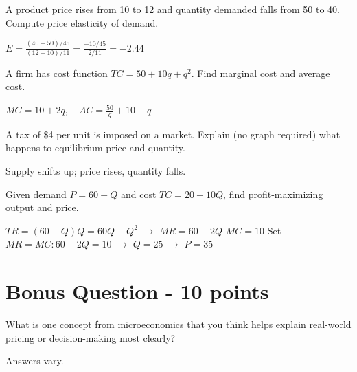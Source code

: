 \documentclass[12pt]{exam}
\begin{document}
\begin{questions}
    \begin{problem}[10]{2in}
    A product price rises from 10 to 12 and quantity demanded falls from 50 to 40. Compute price elasticity of demand.
    \end{problem}
    \begin{solution}
        $E = \frac{(40-50)/45}{(12-10)/11} = \frac{-10/45}{2/11} = -2.44$
    \end{solution}

    \begin{problem}[10]{2in}
    A firm has cost function $TC = 50 + 10q + q^2$. Find marginal cost and average cost.
    \end{problem}
    \begin{solution}
        $MC = 10 + 2q,\quad AC = \frac{50}{q} + 10 + q$
    \end{solution}

    \begin{problem}[10]{2in}
    A tax of \$4 per unit is imposed on a market. Explain (no graph required) what happens to equilibrium price and quantity.
    \end{problem}
    \begin{solution}
        Supply shifts up; price rises, quantity falls.
    \end{solution}

    \begin{problem}[10]{3in}
    Given demand $P = 60 - Q$ and cost $TC = 20 + 10Q$, find profit-maximizing output and price.
    \end{problem}
    \begin{solution}
        $TR = (60-Q)Q = 60Q - Q^2$ $\rightarrow$ $MR = 60 - 2Q$
        $MC = 10$
        Set $MR = MC: 60 - 2Q = 10$ $\rightarrow$ $Q = 25$ $\rightarrow$ $P = 35$
    \end{solution}

    \section*{Bonus Question - 10 points}

    \begin{shortanswer}[10]{3in}
        What is one concept from microeconomics that you think helps explain real-world pricing or decision-making most clearly?
    \end{shortanswer}
    \begin{solution}
        Answers vary.
    \end{solution}

\end{questions}
\end{document}
